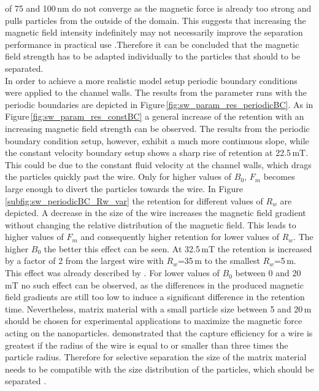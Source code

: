of 75 and 100\,nm do not converge as the magnetic force is already too strong and pulls particles from the outside of the domain. This suggests that increasing the magnetic field intensity indefinitely may not necessarily improve the separation performance in practical use \cite{ge2017magnetic}.Therefore it can be concluded that the magnetic field strength has to be adapted individually to the particles that should to be separated.\\ 

\FloatBarrier
In order to achieve a more realistic model setup periodic boundary conditions were applied to the channel walls. The results from the parameter runs with the periodic boundaries are depicted in Figure\,\ref{fig:sw_param_res_periodicBC}. As in Figure\,\ref{fig:sw_param_res_constBC} a general increase of the retention with an increasing magnetic field strength can be observed. The results from the periodic boundary condition setup, however, exhibit a much more continuous slope, while the constant velocity boundary setup shows a sharp rise of retention at 22.5\,mT. This could be due to the constant fluid velocity at the channel walls, which drags the particles quickly past the wire. Only for higher values of $B_{0}$, $F_{m}$ becomes large enough to divert the particles towards the wire. In Figure \ref{subfig:sw_periodicBC_Rw_var} the retention for different values of $R_{w}$ are depicted. A decrease in the size of the wire increases the magnetic field gradient without changing the relative distribution of the magnetic field. This leads to higher values of $F_{m}$ and consequently higher retention for lower values of $R_{w}$. The higher $B_{0}$ the better this effect can be seen. At 32.5\,mT the retention is increased by a factor of 2 from the largest wire with $R_{w}$=35\,\textmu m to the smallest $R_{w}$=5\,\textmu m. This effect was already described by \cite{aharoni1976traction}. For lower values of $B_{0}$ between 0 and 20\,mT no such effect can be observed, as the differences in the produced magnetic field gradients are still too low to induce a significant difference in the retention time. Nevertheless, matrix material with a small particle size between 5 and 20\,\textmu m should be chosen for experimental applications to maximize the magnetic force acting on the nanoparticles. \cite{oberteuffer1974magnetic} demonstrated that the capture efficiency for a wire is greatest if the radius of the wire is equal to or smaller than three times the particle radius. Therefore for selective separation the size of the matrix material needs to be compatible with the size distribution of the particles, which should be separated \cite{ge2017magnetic}. \newline
